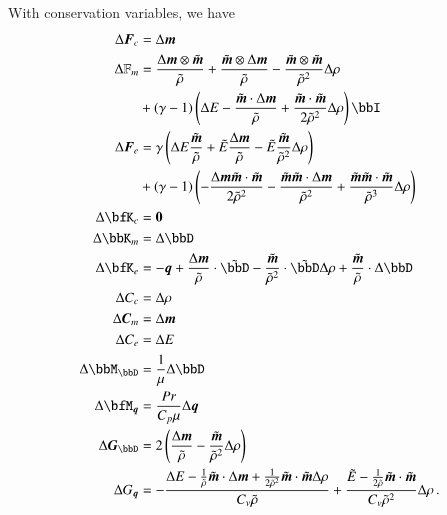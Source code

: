 \documentclass[preprint,12pt]{elsarticle}
\begin{document}
With conservation variables, we have
\begin{align*}
\Delta\bfF_c&=\Delta\bfm\\
\Delta\mathbb{F}_m&=
\frac{\Delta\bfm\otimes\tilde\bfm}{\tilde\rho}
+\frac{\tilde\bfm\otimes\Delta\bfm}{\tilde\rho}
-\frac{\tilde\bfm\otimes\tilde\bfm}{\tilde\rho^2}\Delta\rho\\
&+(\gamma-1)\LRp{\Delta E
-\frac{\tilde\bfm\cdot\Delta\bfm}{\tilde\rho}
+\frac{\tilde\bfm\cdot\tilde\bfm}{2\tilde\rho^2}\Delta\rho
}\bbI\\
\Delta\bfF_e&=
\gamma\LRp{
\Delta E\frac{\tilde\bfm}{\tilde\rho}
+\tilde E\frac{\Delta\bfm}{\tilde\rho}
-\tilde E\frac{\tilde\bfm}{\tilde\rho^2}\Delta\rho}\\
&+(\gamma-1)\LRp{
-\frac{\Delta\bfm\tilde\bfm\cdot\tilde\bfm}{2\tilde\rho^2}
-\frac{\tilde\bfm\tilde\bfm\cdot\Delta\bfm}{\tilde\rho^2}
+\frac{\tilde\bfm\tilde\bfm\cdot\tilde\bfm}{\tilde\rho^3}\Delta\rho
}\\
\Delta\bfK_c&=\bs0\\
\Delta\bbK_m&=\Delta\bbD\\
\Delta\bfK_e&=-\bfq+\frac{\Delta\bfm}{\tilde\rho}\cdot\tilde\bbD
-\frac{\tilde\bfm}{\tilde\rho^2}\cdot\tilde\bbD\Delta\rho
+\frac{\tilde\bfm}{\tilde\rho}\cdot\Delta\bbD\\
\Delta C_c&=\Delta\rho\\
\Delta\bfC_m&=\Delta\bfm\\
\Delta C_e&=\Delta E\\
\Delta\bbM_\bbD&=\frac{1}{\mu}\Delta \bbD\\
\Delta\bfM_{\bfq}&=\frac{Pr}{C_p\mu}\Delta\bfq\\
\Delta\bfG_{\bbD}&=2\LRp{\frac{\Delta\bfm}{\tilde\rho}-\frac{\tilde\bfm}{\tilde\rho^2}\Delta\rho}\\
\Delta G_{\bfq}&=-\frac{\Delta E-\frac{1}{\tilde\rho}\tilde\bfm\cdot\Delta\bfm
	+\frac{1}{2\tilde\rho^2}\tilde\bfm\cdot\tilde\bfm\Delta\rho}{C_v\tilde\rho}
	+\frac{\tilde E-\frac{1}{2\tilde\rho}\tilde\bfm\cdot\tilde\bfm}{C_v\tilde\rho^2}\Delta\rho\,.
\end{align*}
\end{document}

